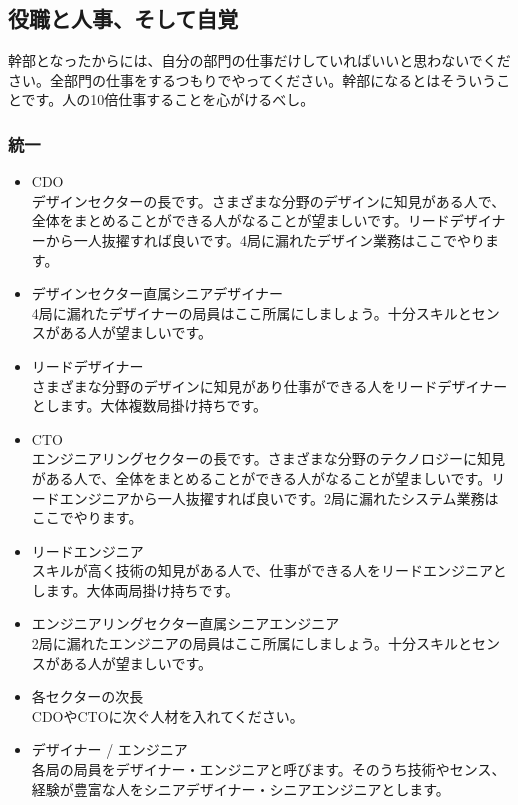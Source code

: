 \documentclass[dvipdfmx,jb5]{jarticle}
\begin{document}
\subsection{役職と人事、そして自覚}
幹部となったからには、自分の部門の仕事だけしていればいいと思わないでください。全部門の仕事をするつもりでやってください。幹部になるとはそういうことです。人の10倍仕事することを心がけるべし。
\subsubsection{統一}
\begin{itemize}
  \item CDO\\
  デザインセクターの長です。さまざまな分野のデザインに知見がある人で、全体をまとめることができる人がなることが望ましいです。リードデザイナーから一人抜擢すれば良いです。4局に漏れたデザイン業務はここでやります。
  \item デザインセクター直属シニアデザイナー\\
  4局に漏れたデザイナーの局員はここ所属にしましょう。十分スキルとセンスがある人が望ましいです。
  \item リードデザイナー\\
  さまざまな分野のデザインに知見があり仕事ができる人をリードデザイナーとします。大体複数局掛け持ちです。
  \item CTO\\
  エンジニアリングセクターの長です。さまざまな分野のテクノロジーに知見がある人で、全体をまとめることができる人がなることが望ましいです。リードエンジニアから一人抜擢すれば良いです。2局に漏れたシステム業務はここでやります。
  \item リードエンジニア\\
  スキルが高く技術の知見がある人で、仕事ができる人をリードエンジニアとします。大体両局掛け持ちです。
  \item エンジニアリングセクター直属シニアエンジニア\\
  2局に漏れたエンジニアの局員はここ所属にしましょう。十分スキルとセンスがある人が望ましいです。
  \item 各セクターの次長\\
  CDOやCTOに次ぐ人材を入れてください。
  \item デザイナー / エンジニア\\
  各局の局員をデザイナー・エンジニアと呼びます。そのうち技術やセンス、経験が豊富な人をシニアデザイナー・シニアエンジニアとします。
\end{itemize}
\end{document}
